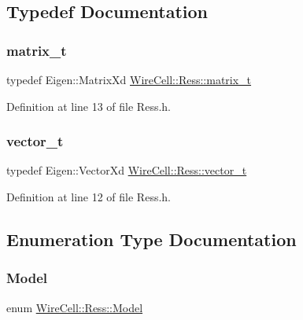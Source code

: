 \subsection{Typedef Documentation}
\mbox{\label{namespace_wire_cell_1_1_ress_a42b8962e4f04a1258a3393990acda985}} 
\subsubsection{\texorpdfstring{matrix\+\_\+t}{matrix\_t}}
{\footnotesize\ttfamily typedef Eigen\+::\+Matrix\+Xd \hyperlink{namespace_wire_cell_1_1_ress_a42b8962e4f04a1258a3393990acda985}{Wire\+Cell\+::\+Ress\+::matrix\+\_\+t}}



Definition at line 13 of file Ress.\+h.

\mbox{\label{namespace_wire_cell_1_1_ress_a4f1e55ff97c04ad9ff5530f3f5e8c453}} 
\subsubsection{\texorpdfstring{vector\+\_\+t}{vector\_t}}
{\footnotesize\ttfamily typedef Eigen\+::\+Vector\+Xd \hyperlink{namespace_wire_cell_1_1_ress_a4f1e55ff97c04ad9ff5530f3f5e8c453}{Wire\+Cell\+::\+Ress\+::vector\+\_\+t}}



Definition at line 12 of file Ress.\+h.



\subsection{Enumeration Type Documentation}
\mbox{\label{namespace_wire_cell_1_1_ress_abca29d9a906e0f4e9be142ff3b3b3573}} 
\subsubsection{\texorpdfstring{Model}{Model}}
{\footnotesize\ttfamily enum \hyperlink{namespace_wire_cell_1_1_ress_abca29d9a906e0f4e9be142ff3b3b3573}{Wire\+Cell\+::\+Ress\+::\+Model}}

